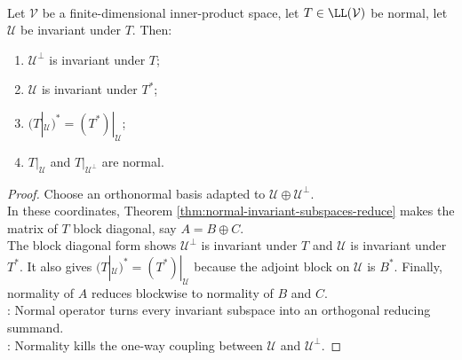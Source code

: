 \begin{corollary} \label{cor:normal-operator-invariant-subspaces-reduce} \\
Let $\mathcal{V}$ be a finite-dimensional inner-product space, let $T\in\LL(\mathcal{V})$ be normal, let $\mathcal{U}$ be invariant under $T$. Then:
\begin{enumerate}[label=(\roman*)]
\setlength{\itemsep}{0pt}
\item $\mathcal{U}^{\perp}$ is invariant under $T$;
\item $\mathcal{U}$ is invariant under $T^*$;
\item $(T|_{\mathcal{U}})^*=(T^*)|_{\mathcal{U}}$;
\item $T|_{\mathcal{U}}$ and $T|_{\mathcal{U}^{\perp}}$ are normal.
\end{enumerate}
\begin{proof}
Choose an orthonormal basis adapted to $\mathcal{U}\oplus\mathcal{U}^{\perp}$.\\
In these coordinates, Theorem \ref{thm:normal-invariant-subspaces-reduce} makes the matrix of $T$ block diagonal, say $A=B\oplus C$.\\
The block diagonal form shows $\mathcal{U}^{\perp}$ is invariant under $T$ and $\mathcal{U}$ is invariant under $T^*$. It also gives $(T|_{\mathcal{U}})^*=(T^*)|_{\mathcal{U}}$ because the adjoint block on $\mathcal{U}$ is $B^*$. Finally, normality of $A$ reduces blockwise to normality of $B$ and $C$.\\
: Normal operator turns every invariant subspace into an orthogonal reducing summand.\\
: Normality kills the one-way coupling between $\mathcal{U}$ and $\mathcal{U}^{\perp}$.
\end{proof}
\end{corollary}

